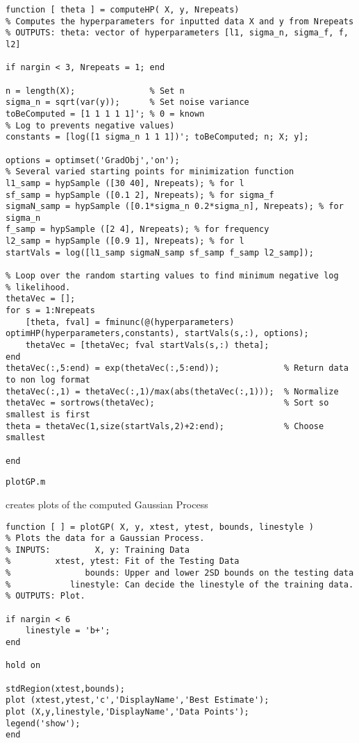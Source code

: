 \documentclass{article}
\begin{document}
\begin{lstlisting}
function [ theta ] = computeHP( X, y, Nrepeats)
% Computes the hyperparameters for inputted data X and y from Nrepeats
% OUTPUTS: theta: vector of hyperparameters [l1, sigma_n, sigma_f, f, l2]

if nargin < 3, Nrepeats = 1; end

n = length(X);               % Set n
sigma_n = sqrt(var(y));      % Set noise variance
toBeComputed = [1 1 1 1 1]'; % 0 = known
% Log to prevents negative values)
constants = [log([1 sigma_n 1 1 1])'; toBeComputed; n; X; y];

options = optimset('GradObj','on');
% Several varied starting points for minimization function
l1_samp = hypSample ([30 40], Nrepeats); % for l
sf_samp = hypSample ([0.1 2], Nrepeats); % for sigma_f
sigmaN_samp = hypSample ([0.1*sigma_n 0.2*sigma_n], Nrepeats); % for sigma_n
f_samp = hypSample ([2 4], Nrepeats); % for frequency
l2_samp = hypSample ([0.9 1], Nrepeats); % for l
startVals = log([l1_samp sigmaN_samp sf_samp f_samp l2_samp]);

% Loop over the random starting values to find minimum negative log
% likelihood.
thetaVec = [];
for s = 1:Nrepeats
    [theta, fval] = fminunc(@(hyperparameters) optimHP(hyperparameters,constants), startVals(s,:), options);
    thetaVec = [thetaVec; fval startVals(s,:) theta];
end
thetaVec(:,5:end) = exp(thetaVec(:,5:end));             % Return data to non log format
thetaVec(:,1) = thetaVec(:,1)/max(abs(thetaVec(:,1)));  % Normalize
thetaVec = sortrows(thetaVec);                          % Sort so smallest is first
theta = thetaVec(1,size(startVals,2)+2:end);            % Choose smallest

end
\end{lstlisting}


\texttt{plotGP.m}

creates plots of the computed Gaussian Process

\begin{lstlisting}
function [ ] = plotGP( X, y, xtest, ytest, bounds, linestyle )
% Plots the data for a Gaussian Process. 
% INPUTS:         X, y: Training Data
%         xtest, ytest: Fit of the Testing Data
%               bounds: Upper and lower 2SD bounds on the testing data
%            linestyle: Can decide the linestyle of the training data.
% OUTPUTS: Plot.

if nargin < 6
    linestyle = 'b+';
end

hold on

stdRegion(xtest,bounds);
plot (xtest,ytest,'c','DisplayName','Best Estimate');
plot (X,y,linestyle,'DisplayName','Data Points');
legend('show');
end
\end{lstlisting}
\end{document}
